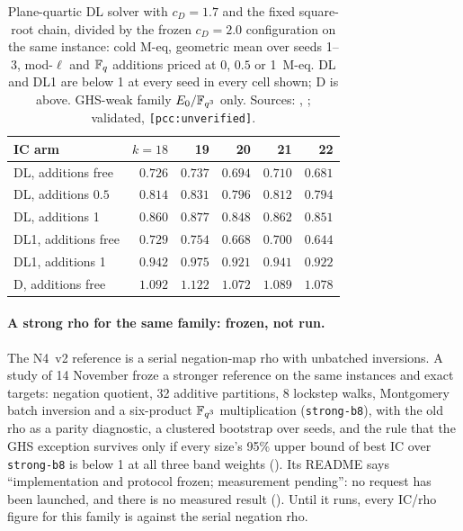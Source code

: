 \begin{table}[t]
\centering\footnotesize
\begin{tabular}{@{}lrrrrr@{}}
\toprule
IC arm & $k=18$ & 19 & 20 & 21 & 22 \\
\midrule
DL, additions free & $0.726$ & $0.737$ & $0.694$ & $0.710$ & $0.681$ \\
DL, additions $0.5$ & $0.814$ & $0.831$ & $0.796$ & $0.812$ & $0.794$ \\
DL, additions 1 & $0.860$ & $0.877$ & $0.848$ & $0.862$ & $0.851$ \\
DL1, additions free & $0.729$ & $0.754$ & $0.668$ & $0.700$ & $0.644$ \\
DL1, additions 1 & $0.942$ & $0.975$ & $0.921$ & $0.941$ & $0.922$ \\
D, additions free & $1.092$ & $1.122$ & $1.072$ & $1.089$ & $1.078$ \\
\bottomrule
\end{tabular}
\caption[]{Plane-quartic DL solver with $c_D=1.7$ and the fixed square-root
chain, divided by the frozen $c_D=2.0$ configuration on the same instance:
cold M-eq, geometric mean over seeds 1--3, mod-$\ell$ and $\mathbb{F}_q$ additions
priced at 0, $0.5$ or 1~M-eq. DL and DL1 are below 1 at every seed in every
cell shown; D is above. GHS-weak family $E_0/\mathbb{F}_{q^3}$ only. Sources:
,
; validated, \texttt{[pcc:unverified]}.}
\label{tab:prog_transfer-dl17}
\end{table}

\paragraph{A strong rho for the same family: frozen, not run.} The N4~v2
reference is a serial negation-map rho with unbatched inversions. A study
of 14 November froze a stronger reference on the same instances and exact
targets: negation quotient, 32 additive partitions, 8 lockstep walks,
Montgomery batch inversion and a six-product $\mathbb{F}_{q^3}$ multiplication
(\texttt{strong-b8}), with the old rho as a parity diagnostic, a clustered
bootstrap over seeds, and the rule that the GHS exception survives only if
every size's 95\% upper bound of best IC over \texttt{strong-b8} is below 1
at all three band weights
(). Its README
says ``implementation and protocol frozen; measurement pending'': no request
has been launched, and there is no measured result
(). Until it runs,
every IC/rho figure for this family is against the serial negation rho.

